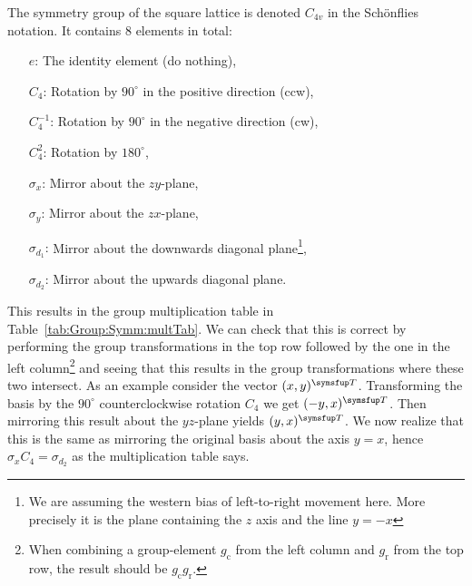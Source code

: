 The symmetry group of the square lattice is denoted $C_{4v}$ in the Sch\"onflies notation. It contains $8$ elements in total:
\begin{itemize}
    \item[$e$:] The identity element (do nothing),
    \item[$C_4$:] Rotation by $90^\circ$ in the positive direction (ccw),
    \item[$C_4^{-1}$:] Rotation by $90^\circ$ in the negative direction (cw),
    \item[$C_4^2$:] Rotation by $180^\circ$,
    \item[$\sigma_x$:] Mirror about the $zy$-plane,
    \item[$\sigma_y$:] Mirror about the $zx$-plane,
    \item[$\sigma_{d_1}$:] Mirror about the downwards diagonal plane\footnote{We are assuming the western bias of left-to-right movement
        here. More precisely it is the plane containing the $z$ axis and the line $y=-x$},
    \item[$\sigma_{d_2}$:] Mirror about the upwards diagonal plane.
\end{itemize}
This results in the group multiplication table in Table~\ref{tab:Group:Symm:multTab}. We can check that this is correct by
performing the group transformations in the top row followed by the one in the left column\footnote{When combining a group-element
$g_\text{c}$ from the left column and $g_\text{r}$ from the top row,
the result should be $g_\text{c}g_\text{r}$.} and seeing that this results
in the group transformations where these two intersect. As an example consider the vector $(x,y)^\trans$. Transforming the
basis by the $90^\circ$ counterclockwise rotation $C_4$ we get $(-y,x)^\trans$. Then mirroring this result about the $yz$-plane
yields $(y,x)^\trans$. We now realize that this is the same as mirroring the original basis about the axis $y=x$, hence
$\sigma_xC_4=\sigma_{d_2}$ as the multiplication table says.
